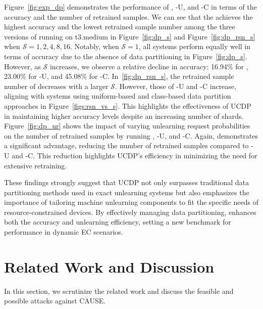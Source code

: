 \documentclass[conference,compsoc]{IEEEtran}
\begin{document}
Figure~\ref{fig:exp_dp} demonstrates the performance of \tool, \tool-U, and \tool-C in terms of the accuracy and the number of retrained samples. We can see that the \tool achieves the highest accuracy and the lowest retrained sample number among the three versions of \tool running on t3.medium in Figure~\ref{fig:dp_s} and Figure~\ref{fig:dp_rsn_s} when $\mathcal{S}=1,2,4,8,16$. Notably, when $\mathcal{S}=1$, all systems perform equally well in terms of accuracy due to the absence of data partitioning in Figure~\ref{fig:dp_s}. However, as $\mathcal{S}$ increases, we observe a relative decline in accuracy: 16.94\% for \tool, 23.00\% for \tool-U, and 45.08\% for \tool-C. In~\ref{fig:dp_rsn_s}, the retrained sample number of \tool decreases with a larger $\mathcal{S}$. However, those of \tool-U and \tool-C increase, aligning with systems using uniform-based and class-based data partition approaches in Figure~\ref{figs:rsn_vs_s}. This highlights the effectiveness of UCDP in maintaining higher accuracy levels despite an increasing number of shards.
Figure~\ref{fig:dp_ur} shows the impact of varying unlearning request probabilities on the number of retrained samples by running \tool, \tool-U, and \tool-C. Again, \tool demonstrates a significant advantage, reducing the number of retrained samples 
compared to \tool-U and \tool-C. This reduction highlights UCDP's efficiency in minimizing the need for extensive retraining.

These findings strongly suggest that UCDP not only surpasses traditional data partitioning methods used in exact unlearning systems but also emphasizes the importance of tailoring machine unlearning components to fit the specific needs of resource-constrained devices. By effectively managing data partitioning, \tool enhances both the accuracy and unlearning efficiency, setting a new benchmark for performance in dynamic EC scenarios.



\section{Related Work and Discussion}

 In this section, we scrutinize the related work and discuss the feasible and possible attacks against CAUSE. 
 
\end{document}
